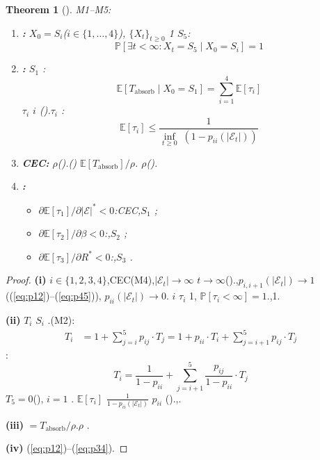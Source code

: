 \documentclass[12pt,a4paper]{article}
\newtheorem{theorem}{Theorem}[section]
\theoremstyle{definition}
\theoremstyle{remark}
\begin{document}
\begin{theorem}[]
\label{thm:absorption}
M1--M5:
\begin{enumerate}[label=(\roman*), itemsep=6pt]
\item \textbf{:}  $X_0 = S_i$($i \in \{1, \ldots, 4\}$), $\{X_t\}_{t \geq 0}$ 1 $S_5$:
\begin{equation}
\mathbb{P}\left[\exists t < \infty : X_t = S_5 \mid X_0 = S_i\right] = 1
\end{equation}

\item \textbf{:}  $S_1$ :
\begin{equation}
\mathbb{E}[T_{\text{absorb}} \mid X_0 = S_1] = \sum_{i=1}^{4} \mathbb{E}[\tau_i]
\end{equation}
 $\tau_i$  $i$ ().$\tau_i$ :
\begin{equation}
\mathbb{E}[\tau_i] \leq \frac{1}{\inf_{t \geq 0} \; (1 - p_{ii}(|\mathcal{E}_t|))}
\end{equation}

\item \textbf{CEC:}  $\rho$().() $\mathbb{E}[T_{\text{absorb}}] / \rho$. $\rho$().

\item \textbf{:}
\begin{itemize}
\item $\partial \mathbb{E}[\tau_1] / \partial |\mathcal{E}|^* < 0$:CEC,$S_1$ ;
\item $\partial \mathbb{E}[\tau_2] / \partial \beta < 0$:,$S_2$ ;
\item $\partial \mathbb{E}[\tau_3] / \partial R^* < 0$:,$S_3$ .
\end{itemize}
\end{enumerate}
\end{theorem}

\begin{proof}
\textbf{(i)}  $i \in \{1,2,3,4\}$,CEC(M4),$|\mathcal{E}_t| \to \infty$  $t \to \infty$().,$p_{i,i+1}(|\mathcal{E}_t|) \to 1$((\ref{eq:p12})--(\ref{eq:p45})), $p_{ii}(|\mathcal{E}_t|) \to 0$. $i$  $\tau_i$ 1, $\mathbb{P}[\tau_i < \infty] = 1$.,1.

\textbf{(ii)}  $T_i$  $S_i$ .(M2):
\begin{align}
T_i &= 1 + \sum_{j=i}^{5} p_{ij} \cdot T_j = 1 + p_{ii} \cdot T_i + \sum_{j=i+1}^{5} p_{ij} \cdot T_j
\end{align}
:
\begin{equation}
T_i = \frac{1}{1 - p_{ii}} + \sum_{j=i+1}^{5} \frac{p_{ij}}{1 - p_{ii}} \cdot T_j
\end{equation}
 $T_5 = 0$(), $i=1$ . $\mathbb{E}[\tau_i]$  $\frac{1}{1 - p_{ii}(|\mathcal{E}_t|)}$  $p_{ii}$ ().,.

\textbf{(iii)}  $= T_{\text{absorb}} / \rho$.$\rho$ .

\textbf{(iv)} (\ref{eq:p12})--(\ref{eq:p34}).
\end{proof}
\end{document}
